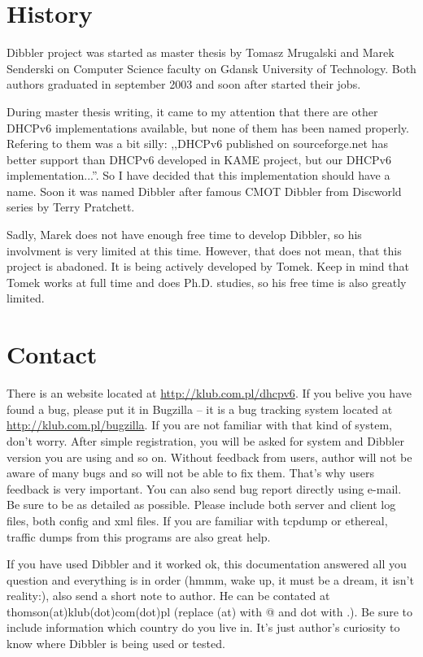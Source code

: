 
\section{History}
 Dibbler project was started as master thesis by Tomasz Mrugalski and
Marek Senderski on Computer Science faculty on Gdansk University of
Technology. Both authors graduated in september 2003 and soon after
started their jobs. 

During master thesis writing, it came to my attention that there are
other DHCPv6 implementations available, but none of them has been
named properly. Refering to them was a bit
silly: ,,DHCPv6 published on sourceforge.net has better support than
DHCPv6 developed in KAME project, but our DHCPv6
implementation...''. So I have decided that this implementation should
have a name. Soon it was named Dibbler after famous CMOT
Dibbler from Discworld series by Terry Pratchett.

Sadly, Marek does not have enough free time to develop Dibbler, so his
involvment is very limited at this time. However, that does not mean,
that this project is abadoned. It is being actively developed by
Tomek. Keep in mind that Tomek works at full time and does
Ph.D. studies, so his free time is also greatly limited.

\section{Contact}
There is an website located at \url{http://klub.com.pl/dhcpv6}. If
you belive you have found a bug, please put it in Bugzilla -- it is a
bug tracking system located at \url{http://klub.com.pl/bugzilla}. If
you are not familiar with that kind of system, don't worry. After
simple registration, you will be asked for system and Dibbler version
you are using and so on. Without feedback from users, author will not
be aware of many bugs and so will not be able to fix them. That's why
users feedback is very important. You can also send bug report
directly using e-mail. Be sure to be as detailed as possible. Please
include both server and client log files, both config and xml
files. If you are familiar with tcpdump or ethereal, traffic dumps
from this programs are also great help.

If you have used Dibbler and it worked ok, this documentation answered
all you question and everything is in order (hmmm, wake up, it must be
a dream, it isn't reality:), also send a short note to author. He can
be contated at thomson(at)klub(dot)com(dot)pl (replace (at) with @ and
dot with .). Be sure to include information which country do you live
in. It's just author's curiosity to know where Dibbler is being used
or tested.

